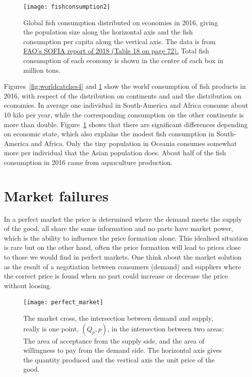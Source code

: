 \documentclass[11pt,fleqn]{book} %
\begin{document}
\begin{figure}[ht]
\flushleft
\texttt{[image: fishconsumption2]}
\caption{Global fish consumption distributed on economies in 2016, giving the population size along the horizontal axis and the fish consumption per capita along the vertical axis. The data is from \href{javascript:new_window(http://www.fao.org/documents/card/en/c/I9540EN)}{FAO's SOFIA report of 2018 (Table 18 on page 72).} Total fish consumption of each economy is shown in the centre of each box in million tons.}
\label{fig:worldcatches5}
\end{figure}

Figures~\ref{fig:worldcatches4} and \ref{fig:worldcatches5} show the world consumption of fish products in 2016, with respect of the distribution on continents and and the distribution on economies. In average one individual in South-America and Africa consume about 10 kilo per year, while the corresponding consumption on the other continents is more than double. Figure~\ref{fig:worldcatches5} shows that there are significant differences depending on economic state, which also explains the modest fish consumption in South-America and Africa. Only the tiny population in Oceania consumes somewhat more per individual that the Asian population does. About half of the fish consumption in 2016 came from aquaculture production.

\section{Market failures}\label{perfect market}
In a perfect market the price is determined where the demand meets the supply of the good, all share the same information and no parts have market power, which is the ability to influence the price formation alone. This idealised situation is rare but on the other hand, often the price formation will lead to prices close to those we would find in perfect markets. One think about the market solution as the result of a negotiation between consumers (demand) and suppliers where the correct price is found when no part could increase or decrease the price without loosing.

\begin{figure}[ht]
\centering
\texttt{[image: perfect\_market]}
\caption{The market cross, the intersection between demand and supply, really is one point, $(Q_p, p)$, in the intersection between two areas: The area of acceptance from the supply side, and the area of willingness to pay from the demand side. The horizontal axis gives the quantity produced and the vertical axis the unit price of the good.}
\label{fig:perfectmarket}
\end{figure}
\end{document}
